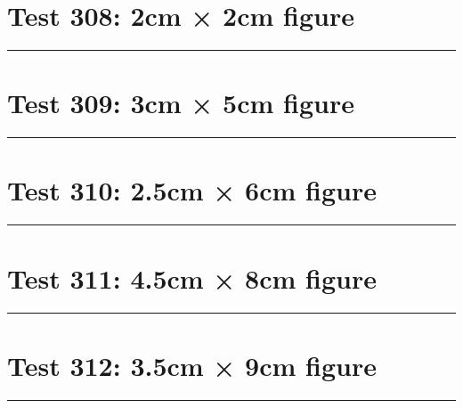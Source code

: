 \documentclass[a4paper,11pt]{article}
\begin{document}
\section*{Test 308: 2cm × 2cm figure}
\begin{swarmwrap}%
  \begin{minipage}[t]{2cm}
    \centering
    \rule{\linewidth}{2cm}
  \end{minipage}%
\end{swarmwrap}%
\swarmwrapnext
\lipsum[5]
\lipsum[6]
\lipsum[7]
\lipsum[8]
\section*{Test 309: 3cm × 5cm figure}
\begin{swarmwrap}%
  \begin{minipage}[t]{3cm}
    \centering
    \rule{\linewidth}{5cm}
  \end{minipage}%
\end{swarmwrap}%
\swarmwrapnext
\lipsum[6]
\lipsum[7]
\lipsum[8]
\lipsum[9]
\lipsum[10]
\section*{Test 310: 2.5cm × 6cm figure}
\begin{swarmwrap}%
  \begin{minipage}[t]{2cm}
    \centering
    \rule{\linewidth}{6cm}
  \end{minipage}%
\end{swarmwrap}%
\swarmwrapnext
\lipsum[34]
\lipsum[35]
\lipsum[36]
\section*{Test 311: 4.5cm × 8cm figure}
\begin{swarmwrap}%
  \begin{minipage}[t]{4cm}
    \centering
    \rule{\linewidth}{8cm}
  \end{minipage}%
\end{swarmwrap}%
\swarmwrapnext
\lipsum[18]
\lipsum[19]
\lipsum[20]
\section*{Test 312: 3.5cm × 9cm figure}
\begin{swarmwrap}%
  \begin{minipage}[t]{3cm}
    \centering
    \rule{\linewidth}{9cm}
  \end{minipage}%
\end{swarmwrap}%
\swarmwrapnext
\lipsum[133]
\lipsum[134]
\lipsum[135]
\lipsum[136]
\lipsum[137]
\end{document}
